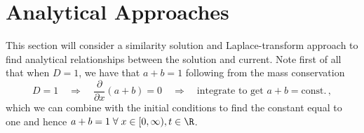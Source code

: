 \documentclass{prettytex/ox/mmsc-special-topic}
\begin{document}
  \section{Analytical Approaches}
  \label{sec:analytical-approaches}
  This section will consider a similarity solution and Laplace-transform approach to find analytical relationships between the solution and current.
  Note first of all that when $D = 1$, we have that $a + b = 1$ following from the mass conservation 
  $$D = 1 \quad\Rightarrow\quad \frac{\partial}{\partial x} (a + b) = 0 \quad\Rightarrow\quad \text{integrate to get } a + b = \text{const}.\,,$$
  which we can combine with the initial conditions  to find the constant equal to one and hence $a + b = 1\; \forall\; x\in[0, \infty), t\in\R$.
\end{document}
